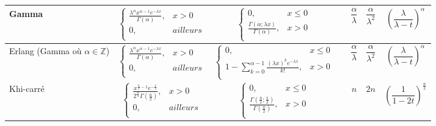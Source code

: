 \documentclass[10pt, french]{article}
\begin{document}
\begin{tabularx}{\textwidth}{ | Y | c | c | c | c | c | c  |}
Gamma & $
 \left\{
    	\begin{array}{ll}
    		\frac{\lambda^{\alpha} x^{\alpha - 1} e^{-\lambda x}}{\Gamma (\alpha)}, &  x > 0 \\
    		0,  &  ailleurs \\
    	\end{array}
    \right.
    $& $
	\left\{
    	\begin{array}{ll}
		0, & x \le 0 \\
		\frac{\Gamma(\alpha; \lambda x)}{\Gamma (\alpha)}, &  x > 0 \\
    	\end{array}
    \right.$
	& 
	& $\dfrac{\alpha}{\lambda}$
	& $\dfrac{\alpha}{\lambda^2}$
	& $\left(\dfrac{\lambda}{\lambda - t}\right)^\alpha$ \\ 
\hline

Erlang (Gamma où $\alpha \in \mathbb{Z} $) & $
 \left\{
    	\begin{array}{ll}
    		\frac{\lambda^{\alpha} x^{\alpha - 1} e^{-\lambda x}}{\Gamma (\alpha)}, &  x > 0 \\
    		0,  &  ailleurs \\
    	\end{array}
    \right.
    $& $
	\left\{
    	\begin{array}{ll}
		0, & x \le 0 \\
		1 - \sum_{k=0}^{\alpha - 1} \frac{(\lambda x)^k e^{- \lambda x}}{k!}, &  x > 0 \\
    	\end{array}
    \right.$
	& 
	& $\dfrac{\alpha}{\lambda}$
	& $\dfrac{\alpha}{\lambda^2}$
	& $\left(\dfrac{\lambda}{\lambda - t}\right)^\alpha$ \\ 
\hline

 Khi-carré & $
 \left\{
    	\begin{array}{ll}
    		\frac{ x^{\frac{n}{2} - 1} e^{-\frac{x}{2}}}{2^{\frac{n}{2}} \Gamma \left(\frac{n}{2}\right)}, &  x > 0 \\
    		0,  &  ailleurs \\
    	\end{array}
    \right.
    $&$
	\left\{
    	\begin{array}{ll}
		0, & x \le 0 \\
		\frac{\Gamma\left(\frac{n}{2}; \frac{x}{2}\right)}{\Gamma \left(\frac{n}{2}\right)}, &  x > 0 \\
    	\end{array}
    \right.$
	& 
	& $n$
	& $2n$
	& $\left(\dfrac{1}{1- 2t}\right)^{\frac{n}{2}}$ \\ 
\hline


\end{tabularx}
\end{document}
